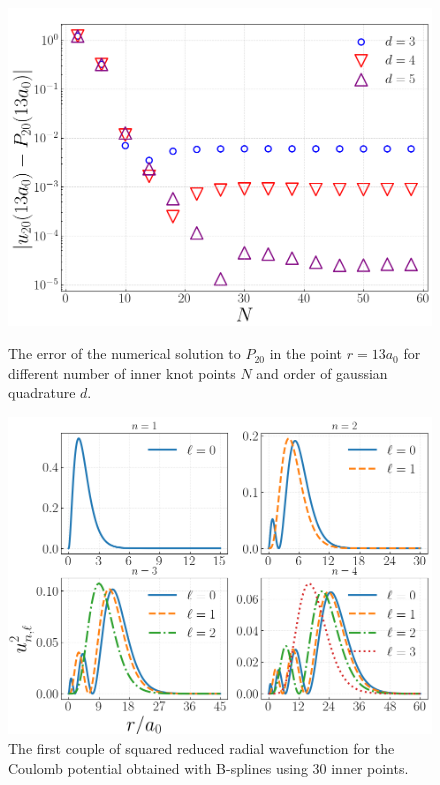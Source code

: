 \documentclass[twocolumn]{article}
\begin{document}
\begin{large}
\begin{figure}[h]
    \label{27apr2138}
\end{figure}
\begin{figure}[h]
    \includegraphics[scale=0.33]{error_u20_2.png}
    \caption{The error of the numerical solution to $P_{20}$ in the point $r=13a_0$ for different number of inner knot points $N$ and order of gaussian quadrature $d$.}
    \label{27apr2139}
    \includegraphics[scale=0.35]{Hatom.png}
    \caption{The first couple of squared reduced radial wavefunction for the Coulomb potential obtained with B-splines using 30 inner points.}
    \label{27apr2216}
\end{figure}

\end{large}
\end{document}
